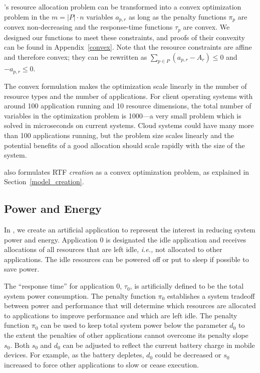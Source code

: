 \pacora's resource allocation problem can be transformed into a convex
optimization problem in the $m = |P|\cdot n$ variables $a_{p,r}$ as
long as the penalty functions $\pi_p$ are convex non-decreasing and
the response-time functions $\tau_p$ are convex.  We designed our
functions to meet these constraints, and proofs of their convexity can
be found in Appendix~\ref{convex}. Note that the resource constraints
are affine and therefore convex; they can be rewritten as $\sum_{p\in
  P} (a_{p,r} - A_r) \leq 0$ and $-a_{p,r} \leq 0$.

The convex formulation makes the optimization scale linearly in the
number of resource types and the number of applications.  For client
operating systems with around 100 application running and 10 resource
dimensions, the total number of variables in the optimization problem
is 1000---a very small problem which is solved in microseconds on
current systems.  Cloud systems could have many more than 100
applications running, but the problem size scales linearly and the
potential benefits of a good allocation should scale rapidly with the
size of the system.

\pacora also formulates RTF \emph{creation} as a convex optimization
problem, as explained in Section~\ref{model_creation}.

\subsection{Power and Energy}
In \pacora, we create an artificial application to represent the
interest in reducing system power and energy.  Application 0 is
designated the idle application and receives allocations of all
resources that are left idle, \emph{i.e.,} not allocated to other
applications.  The idle resources can be powered off or put to sleep
if possible to save power.

The ``response time'' for application 0, $\tau_0$, is artificially
defined to be the total system power consumption.
The penalty function $\pi_0$ establishes a system tradeoff between
power and performance that will determine which resources are
allocated to applications to improve performance and which are left
idle.  The penalty function $\pi_0$ can be used to keep total system
power below the parameter $d_0$ to the extent the penalties of other
applications cannot overcome its penalty slope $s_0$. Both $s_0$ and
$d_0$ can be adjusted to reflect the current battery charge in mobile
devices. For example, as the battery depletes, $d_0$ could be decreased or $s_0$ increased
to force other applications to slow or cease execution.




